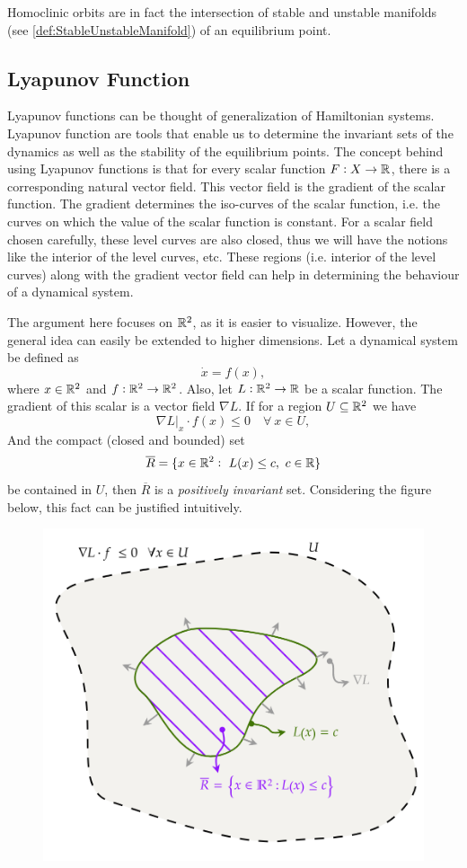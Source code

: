 Homoclinic orbits are in fact the intersection of stable and unstable manifolds (see \autoref{def:StableUnstableManifold}) of an equilibrium point. 


\subsection{Lyapunov Function}

Lyapunov functions can be thought of generalization of Hamiltonian systems. Lyapunov function are tools that enable us to determine the invariant sets of the dynamics as well as the stability of the equilibrium points. The concept behind using Lyapunov functions is that for every scalar function $F:X\to \mathbb{R}$, there is a corresponding natural vector field. This vector field is the gradient of the scalar function. The gradient determines the iso-curves of the scalar function, i.e. the curves on which the value of the scalar function is constant. For a scalar field chosen carefully, these level curves are also closed, thus we will have the notions like the interior of the level curves, etc. These regions (i.e. interior of the level curves) along with the gradient vector field can help in determining the behaviour of a dynamical system.

The argument here focuses on $\mathbb{R}^2$, as it is easier to visualize. However, the general idea can easily be extended to higher dimensions. Let a dynamical system be defined as
\[ \dot{x} = f(x), \]
where $x\in\mathbb{R}^2$ and $f:\mathbb{R}^2 \to \mathbb{R}^2$. Also, let $L:\mathbb{R}^2\to\mathbb{R}$ be a scalar function. The gradient of this scalar is a vector field $\nabla L$. If for a region $U \subseteq \mathbb{R}^2$ we have
\[ \nabla L \big|_{x} \cdot f(x) \leq 0 \quad \forall\ x\in U, \]
And the compact (closed and bounded) set 
\[ \overline{R} = \{ x\in\R^2:\ L(x) \leq c,\ c\in\R\} \]
be contained in $U$, then $\overline{R}$ is a \emph{positively invariant} set. Considering the figure below, this fact can be justified intuitively.

\begin{figure}[h!]
	\centering
	\includegraphics[width=0.4\linewidth]{Images/LyapunovFunction.png}
\end{figure}

